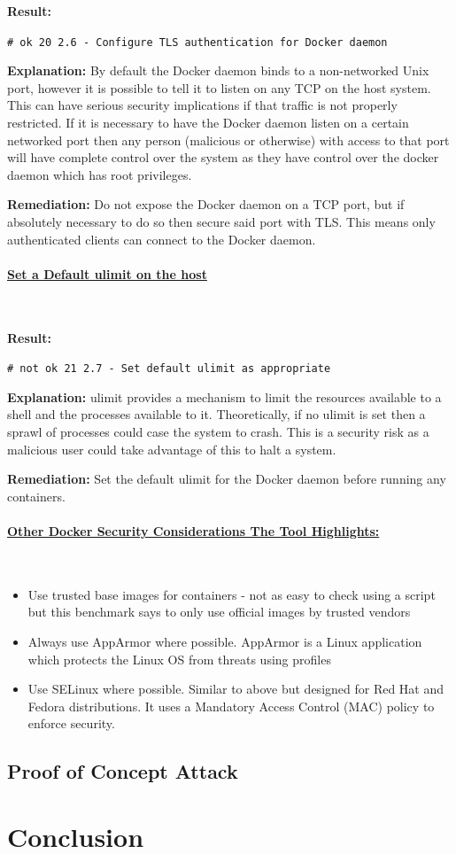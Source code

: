 \documentclass{article}
\begin{document}
\textbf{Result:} 

\texttt{\# ok 20 2.6  - Configure TLS authentication for Docker daemon}

\textbf{Explanation:} By default the Docker daemon binds to a non-networked Unix port, however it is possible to tell it to listen on any TCP on the host system. This can have serious security implications if that traffic is not properly restricted. If it is necessary to have the Docker daemon listen on a certain networked port then any person (malicious or otherwise) with access to that port will have complete control over the system as they have control over the docker daemon which has root privileges.

\textbf{Remediation:} Do not expose the Docker daemon on a TCP port, but if absolutely necessary to do so then secure said port with TLS. This means only authenticated clients can connect to the Docker daemon.

\paragraph{\underline{Set a Default ulimit on the host}}\mbox{}\\
\label{par:ulimit}

\textbf{Result:} 

\texttt{\# not ok 21 2.7 - Set default ulimit as appropriate}

\textbf{Explanation:} ulimit provides a mechanism to limit the resources available to a shell and the processes available to it. Theoretically, if no ulimit is set then a sprawl of processes could case the system to crash. This is a security risk as a malicious user could take advantage of this to halt a system.

\textbf{Remediation:} Set the default ulimit for the Docker daemon before running any containers.

\paragraph{\underline{Other Docker Security Considerations The Tool Highlights:}}\mbox{}\\

\begin{itemize}
  \item Use trusted base images for containers - not as easy to check using a script but this benchmark says to only use official images by trusted vendors
  \item Always use AppArmor where possible. AppArmor is a Linux application which protects the Linux OS from threats using profiles
  \item Use SELinux where possible. Similar to above but designed for Red Hat and Fedora distributions. It uses a Mandatory Access Control (MAC) policy to enforce security.
\end{itemize}

\subsection{Proof of Concept Attack}
\label{sub:attack}

\newpage
\section{Conclusion}
\label{sec:Conclusion}

\newpage

\end{document}
